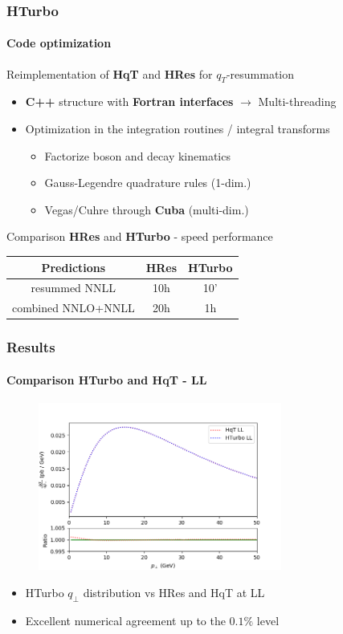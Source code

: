 \documentclass[aspectratio=43]{beamer}
\begin{document}
\begin{frame}

	\frametitle{HTurbo}
	\framesubtitle{Code optimization}
	
	Reimplementation of \textbf{HqT} and \textbf{HRes} for $q_{T}$-resummation
	\begin{itemize}
		\item \textbf{C++} structure with \textbf{Fortran interfaces} $\rightarrow$ Multi-threading
		\item Optimization in the integration routines / integral transforms 
		\begin{itemize}
			\item Factorize boson and decay kinematics
			\item Gauss-Legendre quadrature rules (1-dim.)
			\item Vegas/Cuhre through \textbf{Cuba} (multi-dim.)
		\end{itemize}
	\end{itemize}
	
	\vspace{0.5cm}
	
	Comparison \textbf{HRes} and \textbf{HTurbo} - speed performance \\
	\center
	\begin{tabular}{ | c | c | c | }
		\hline
		Predictions & \textbf{HRes} & \textbf{HTurbo} \\ 
		\hline
		resummed NNLL & 10h & 10' \\
		\hline
		combined NNLO+NNLL & 20h & 1h \\
		\hline
	\end{tabular}

	
\end{frame}

\begin{frame}
	
	\frametitle{Results}
	\framesubtitle{Comparison HTurbo and HqT - LL}
	
	\begin{figure}
		\includegraphics[width = 8cm]{plots/part_III/hturbo_LL.png}
	\end{figure}
	
	\begin{itemize}
		\item HTurbo $q_{\perp}$ distribution vs HRes and HqT at LL
		\item Excellent numerical agreement up to the $0.1\%$ level
	\end{itemize}

\end{frame}
\end{document}
